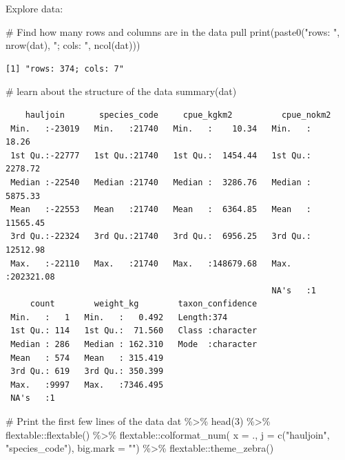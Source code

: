 \documentclass[
  letterpaper,
  oneside,
  open=any]{scrbook}
\newenvironment{Shaded}{\begin{snugshade}}{\end{snugshade}}
\newcommand{\AttributeTok}[1]{\textcolor[rgb]{0.40,0.45,0.13}{#1}}
\newcommand{\CommentTok}[1]{\textcolor[rgb]{0.37,0.37,0.37}{#1}}
\newcommand{\DecValTok}[1]{\textcolor[rgb]{0.68,0.00,0.00}{#1}}
\newcommand{\FunctionTok}[1]{\textcolor[rgb]{0.28,0.35,0.67}{#1}}
\newcommand{\NormalTok}[1]{\textcolor[rgb]{0.00,0.23,0.31}{#1}}
\newcommand{\SpecialCharTok}[1]{\textcolor[rgb]{0.37,0.37,0.37}{#1}}
\newcommand{\StringTok}[1]{\textcolor[rgb]{0.13,0.47,0.30}{#1}}
\begin{document}
Explore data:

\begin{Shaded}
\begin{Highlighting}[]
\CommentTok{\# Find how many rows and columns are in the data pull}
\FunctionTok{print}\NormalTok{(}\FunctionTok{paste0}\NormalTok{(}\StringTok{"rows: "}\NormalTok{, }\FunctionTok{nrow}\NormalTok{(dat), }\StringTok{"; cols: "}\NormalTok{, }\FunctionTok{ncol}\NormalTok{(dat)))}
\end{Highlighting}
\end{Shaded}

\begin{verbatim}
[1] "rows: 374; cols: 7"
\end{verbatim}

\begin{Shaded}
\begin{Highlighting}[]
\CommentTok{\# learn about the structure of the data}
\FunctionTok{summary}\NormalTok{(dat)}
\end{Highlighting}
\end{Shaded}

\begin{verbatim}
    hauljoin       species_code     cpue_kgkm2          cpue_nokm2       
 Min.   :-23019   Min.   :21740   Min.   :    10.34   Min.   :    18.26  
 1st Qu.:-22777   1st Qu.:21740   1st Qu.:  1454.44   1st Qu.:  2278.72  
 Median :-22540   Median :21740   Median :  3286.76   Median :  5875.33  
 Mean   :-22553   Mean   :21740   Mean   :  6364.85   Mean   : 11565.45  
 3rd Qu.:-22324   3rd Qu.:21740   3rd Qu.:  6956.25   3rd Qu.: 12512.98  
 Max.   :-22110   Max.   :21740   Max.   :148679.68   Max.   :202321.08  
                                                      NA's   :1          
     count        weight_kg        taxon_confidence  
 Min.   :   1   Min.   :   0.492   Length:374        
 1st Qu.: 114   1st Qu.:  71.560   Class :character  
 Median : 286   Median : 162.310   Mode  :character  
 Mean   : 574   Mean   : 315.419                     
 3rd Qu.: 619   3rd Qu.: 350.399                     
 Max.   :9997   Max.   :7346.495                     
 NA's   :1                                           
\end{verbatim}

\begin{Shaded}
\begin{Highlighting}[]
\CommentTok{\# Print the first few lines of the data }
\NormalTok{dat }\SpecialCharTok{\%\textgreater{}\%} 
  \FunctionTok{head}\NormalTok{(}\DecValTok{3}\NormalTok{) }\SpecialCharTok{\%\textgreater{}\%} 
\NormalTok{  flextable}\SpecialCharTok{::}\FunctionTok{flextable}\NormalTok{() }\SpecialCharTok{\%\textgreater{}\%}
\NormalTok{  flextable}\SpecialCharTok{::}\FunctionTok{colformat\_num}\NormalTok{(}
      \AttributeTok{x =}\NormalTok{ ., }
      \AttributeTok{j =} \FunctionTok{c}\NormalTok{(}\StringTok{"hauljoin"}\NormalTok{, }\StringTok{"species\_code"}\NormalTok{), }
      \AttributeTok{big.mark =} \StringTok{""}\NormalTok{) }\SpecialCharTok{\%\textgreater{}\%} 
\NormalTok{  flextable}\SpecialCharTok{::}\FunctionTok{theme\_zebra}\NormalTok{()}
\end{Highlighting}
\end{Shaded}
\end{document}
